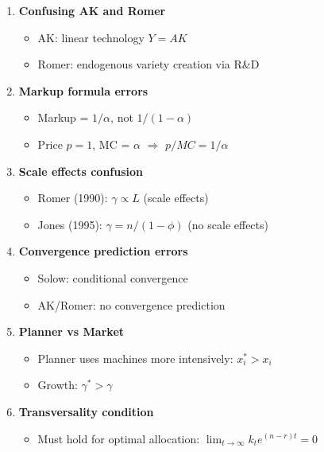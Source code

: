 \documentclass[a4paper,11pt]{article}
\begin{document}
\begin{enumerate}
    \item \textbf{Confusing AK and Romer}
    \begin{itemize}
        \item AK: linear technology $Y = AK$
        \item Romer: endogenous variety creation via R\&D
    \end{itemize}

    \item \textbf{Markup formula errors}
    \begin{itemize}
        \item Markup = $1/\alpha$, not $1/(1-\alpha)$
        \item Price $p = 1$, MC = $\alpha$ $\Rightarrow$ $p/MC = 1/\alpha$
    \end{itemize}

    \item \textbf{Scale effects confusion}
    \begin{itemize}
        \item Romer (1990): $\gamma \propto L$ (scale effects)
        \item Jones (1995): $\gamma = n/(1-\phi)$ (no scale effects)
    \end{itemize}

    \item \textbf{Convergence prediction errors}
    \begin{itemize}
        \item Solow: conditional convergence
        \item AK/Romer: no convergence prediction
    \end{itemize}

    \item \textbf{Planner vs Market}
    \begin{itemize}
        \item Planner uses machines more intensively: $x_i^* > x_i$
        \item Growth: $\gamma^* > \gamma$
    \end{itemize}

    \item \textbf{Transversality condition}
    \begin{itemize}
        \item Must hold for optimal allocation: $\lim_{t\to\infty} k_t e^{(n-r)t} = 0$
    \end{itemize}
\end{enumerate}
\end{document}
